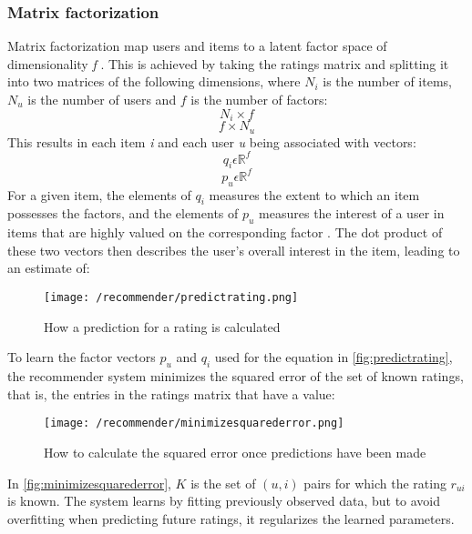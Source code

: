 \subsubsection{Matrix factorization}
Matrix factorization map users and items to a latent factor space of dimensionality \textit{f} \cite{MatrixFactorization}. 
\cite{Kilde er fucked}
This is achieved by taking the ratings matrix and splitting it into two matrices of the following dimensions, where $N_{i}$ is the number of items, $N_{u}$ is the number of users and $f$ is the number of factors:
\begin{equation}
    N_{i} \times f
\end{equation} 
\begin{equation}
    f \times N_{u}
\end{equation}
This results in each item \textit{i} and each user \textit{u} being associated with vectors: 
\begin{equation}
    q_{i} \epsilon \mathbb{R}^f
\end{equation}
\begin{equation}
    p_{u} \epsilon \mathbb{R}^f
\end{equation}
For a given item, the elements of $q_{i}$ measures the extent to which an item possesses the factors, and the elements of $p_{u}$ measures the interest of a user in items that are highly valued on the corresponding factor \cite{MatrixFactorization}.
The dot product of these two vectors then describes the user's overall interest in the item, leading to an estimate of:
\begin{figure}[H]
    \centering
    \texttt{[image: /recommender/predictrating.png]}
     \caption{How a prediction for a rating is calculated}
     \label{fig:predictrating}
 \end{figure}
 \noindent
To learn the factor vectors $p_{u}$ and $q_{i}$ used for the equation in \autoref{fig:predictrating}, the recommender system minimizes the squared error of the set of known ratings, that is, the entries in the ratings matrix that have a value:
 \begin{figure}[H]
    \centering
    \texttt{[image: /recommender/minimizesquarederror.png]}
     \caption{How to calculate the squared error once predictions have been made}
     \label{fig:minimizesquarederror}
 \end{figure}
 \noindent
 In \autoref{fig:minimizesquarederror}, $K$ is the set of $(u, i)$ pairs for which the rating $r_{ui}$ is known.
 The system learns by fitting previously observed data, but to avoid overfitting when predicting future ratings, it regularizes the learned parameters.
